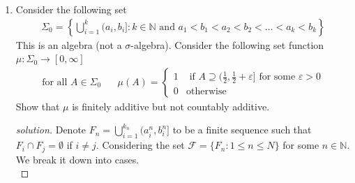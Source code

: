 \documentclass[12pt]{article}
\begin{document}
\begin{enumerate}
\begin{proof}[solution]
								\begin{align*}
					\mathcal{G} = \{ E \in \mathbb{R} \colon E \text{ is countable or } E^c \text{ is countable } \} \cup \{\emptyset, \mathbb{R}\}
				\end{align*}
				We want to show that $\mathcal{G} = \Sigma$. We need to show that $\mathcal{G}$ is a $\sigma$-algebra first. The only non trivial condition is closure under countable union. Consider a sequence $\{E_n \colon n \geq 1\} \in \mathcal{G}$, if $A_n$ is countably for all $n$, then we get closure for free. If $A_n^c$ is countable for some $n_0$ , then
				\begin{align*}
					\left(\bigcup_{n \geq 1} A_n \right)^c = \bigcap_{n \geq 1} A_n^c \in \mathcal{G} 
				\end{align*}
				That means, by definition of $\mathcal{G}$, $\bigcup_{n \geq 1} A_n \in \mathcal{G}$, thus it is a sigma algebra. It's obvious that $\Sigma \subseteq \mathcal{G}$, and we've shown the other direction thus $\Sigma = \mathcal{G}$. But then there's a contradiction since we can take any open interval like $(0,1)$, which is in $\mathcal{B}(\mathbb{R})$, but not in $\Sigma$. 
				\end{proof}
			\item \label{q:5}
				Consider the following set 
				\begin{align*}
					\Sigma_0 = \left\{\bigcup_{i=1}^k (a_i, b_i] \colon k \in \mathbb{N} \text{ and } a_1 < b_1 < a_2 < b_2 < \ldots < a_k < b_k \right\}
				\end{align*}
				This is an algebra (not a $\sigma$-algebra). Consider the following set function $\mu \colon \Sigma_0 \to [0,\infty]$
				\begin{align*}
					\text{for all $A \in \Sigma_0$ } \quad \mu(A) = \begin{cases}
						1 & \text{ if $A \supseteq (\frac{1}{2}, \frac{1}{2} + \varepsilon] $ for some $\varepsilon > 0$} \\
						0 & \text{otherwise}
					\end{cases}
				\end{align*}
				Show that $\mu$ is finitely additive but not countably additive.
				\begin{proof}[solution]
					Denote $F_n = \bigcup_{i = 1}^{k_n} (a_i^n, b_i^n]$ to be a finite sequence such that $F_i \cap F_j = \emptyset$ if $i \neq j$. Considering the set $\mathcal{F} = \{F_n \colon 1 \leq n \leq N\}$ for some $n \in \mathbb{N}$. We break it down into cases. \\

\end{proof}
\end{enumerate}
\end{document}
